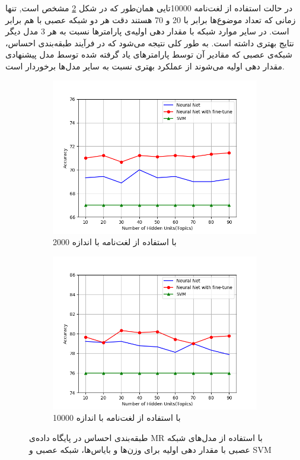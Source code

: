 در حالت استفاده از لغت‌نامه 10000تایی همان‌طور که در شکل 
\ref{chap5-fig6sub2}
مشخص است, تنها زمانی که تعداد موضوع‌ها برابر با 20 و 70 هستند دقت هر دو شبکه عصبی با هم برابر است. در سایر موارد شبکه با مقدار دهی
 اولیه‌ی پارامترها نسبت به هر 3 مدل دیگر نتایج بهتری داشته است. به طور کلی نتیجه می‌شود که در فرآیند طبقه‌بندی احساس، شبکه‌ی عصبی که مقادیر آن توسط پارامترهای یاد گرفته شده توسط مدل پیشنهادی مقدار دهی اولیه می‌شوند از عملکرد بهتری نسبت به سایر مدل‌ها برخوردار است.
\begin{figure}[!t]
	\centering
	\begin{subfigure}{.45\textwidth}
		\includegraphics[scale = .4]{chap5-img/sc-c}
		\caption{ با استفاده از  لغت‌نامه با اندازه 2000}
		\label{chap5-fig6sub1}
	\end{subfigure}		
	\begin{subfigure}{.45\textwidth}
		\includegraphics[scale =.4]{chap5-img/sc-d}
		\caption{ با استفاده از  لغت‌نامه با اندازه 10000 }
		\label{chap5-fig6sub2}
	\end{subfigure}
	\caption{طبقه‌بندی احساس در پایگاه داده‌ی MR با استفاده از مدل‌های شبکه عصبی با مقدار دهی اولیه برای وزن‌ها و بایاس‌ها، شبکه عصبی و SVM }
	\label{chap5-fig6}
\end{figure}

